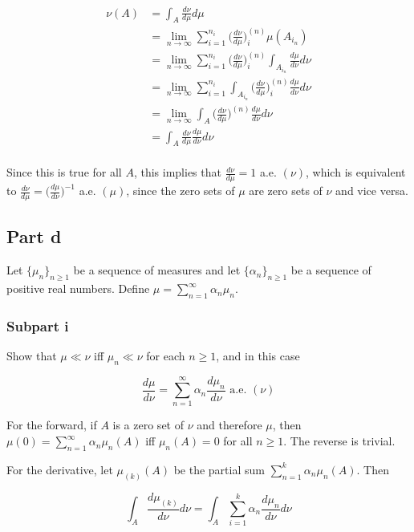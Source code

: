 \documentclass{article}
\begin{document}
\begin{align*}
\nu(A) &= \int_A \frac{d\nu}{d\mu} d\mu \\
&= \lim_{n\rightarrow \infty}\sum_{i=1}^{n_i} \biggl( \frac{d\nu}{d\mu} \biggr)^{(n)}_i \mu(A_{i_n}) \\
&= \lim_{n\rightarrow \infty}\sum_{i=1}^{n_i} \biggl( \frac{d\nu}{d\mu} \biggr)^{(n)}_i \int_{A_{i_n}} \frac{d\mu}{d\nu} d\nu \\
&= \lim_{n\rightarrow \infty}\sum_{i=1}^{n_i} \int_{A_{i_n}} \biggl( \frac{d\nu}{d\mu} \biggr)^{(n)}_i \frac{d\mu}{d\nu} d\nu \\
&= \lim_{n\rightarrow \infty} \int_{A} \biggl( \frac{d\nu}{d\mu} \biggr)^{(n)} \frac{d\mu}{d\nu} d\nu \\
&= \int_{A} \frac{d\nu}{d\mu} \frac{d\mu}{d\nu} d\nu \\
\end{align*}

Since this is true for all $A$, this implies that $\frac{d\nu}{d\mu} = 1$ a.e. $(\nu)$, which is equivalent to $\frac{d\nu}{d\mu} = \biggl( \frac{d\mu}{d\nu} \biggr)^{-1}$ a.e. $(\mu)$, since the zero sets of $\mu$ are zero sets of $\nu$ and vice versa.

\subsection*{Part d}

Let $\{\mu_n\}_{n \geq 1}$ be a sequence of measures and let $\{\alpha_n\}_{n \geq 1}$ be a sequence of positive real numbers. Define $\mu = \sum_{n=1}^\infty \alpha_n \mu_n$.

\subsubsection*{Subpart i}

Show that $\mu \ll \nu$ iff $\mu_n \ll \nu$ for each $n \geq 1$, and in this case

\[
\frac{d\mu}{d\nu} = \sum_{n=1}^\infty \alpha_n \frac{d\mu_n}{d\nu} \text{ a.e. } (\nu)
\]

For the forward, if $A$ is a zero set of $\nu$ and therefore $\mu$, then $\mu(0) = \sum_{n=1}^\infty \alpha_n\mu_n(A)$ iff $\mu_n(A)=0$ for all $n \geq 1$. The reverse is trivial.

For the derivative, let $\mu_{(k)}(A)$ be the partial sum $\sum_{n=1}^k \alpha_n\mu_n(A)$. Then 

\[
\int_A \frac{d\mu_{(k)}}{d\nu} d\nu = \int_A\sum_{i=1}^k\alpha_n \frac{d\mu_n}{d\nu} d\nu
\]
\end{document}
